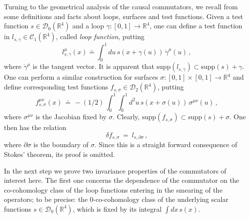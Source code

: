 \documentclass[11pt]{article}
\numberwithin{equation}{section}
\newcommand{\RR}{{\mathbb R}}
\newcommand{\Cc}{{\mathcal{C}}}
\newcommand{\Dc}{{\mathcal{D}}}
\newcommand{\supp}{{\mathrm{supp}}}
\begin{document}
Turning to the geometrical analysis of the causal commutators, 
we recall from \cite[Sect.~3]{BuCiRuVa2} some definitions 
and facts about loops, surfaces and test functions.
%
%
Given a test function $s \in \Dc_0(\RR^4)$ and a 
loop $\gamma : [0,1] \to \RR^4$, one can define 
a test function in $l_{s,\gamma} \in \Cc_1(\RR^4)$, 
called \emph{loop function}, putting 
%
$$
l_{s,\gamma}^\mu(x) \doteq \int_0^1 \! du \, s( x + \gamma(u) ) \, 
\dot{\gamma}^\mu(u) \, ,
$$
%
where $\dot{\gamma}^\mu$ is the tangent vector. It is apparent that 
$\supp(l_{s,\gamma}) \subset \supp(s) + \gamma$. One can perform 
a similar construction for surfaces 
$\sigma : [0,1] \times [0,1] \rightarrow \RR^4$ and define
corresponding test functions $f_{s,\sigma} \in \Dc_2(\RR^4)$, putting 
%
$$
f_{s,\sigma}^{\mu\nu}(x) \, \doteq \, 
- (1/2) \, \int_0^1 \! \! \int_0^1 \! d^2u \, s( x + \sigma(u) ) \, 
\sigma^{\mu\nu}(u) \, ,
$$
where $\sigma^{\mu\nu}$ is the Jacobian fixed by $\sigma$. 
Clearly, $\supp(f_{s,\sigma}) \subset \supp(s) + \sigma$.
One then has the relation 
%
\begin{equation}
\label{eq.coStokes}
\delta f_{s,\sigma} \ = \ l_{s,\partial \sigma} \, ,
\end{equation}
%
where $\partial \sigma$ is the boundary of $\sigma$. 
Since this is a straight forward consequence of Stokes' theorem,
its proof is omitted.

\medskip
In the next step we prove two invariance properties
of the commutators of interest here. 
The first one concerns the dependence of the commutator
on the co-cohomology class of the loop functions 
entering in the smearing of the operators; to be precise:  
the 0-co-cohomology class of the underlying scalar functions
$s \in \Dc_0(\RR^4)$, which is fixed by 
its integral $\int \! dx \, s(x)$. 
\end{document}

